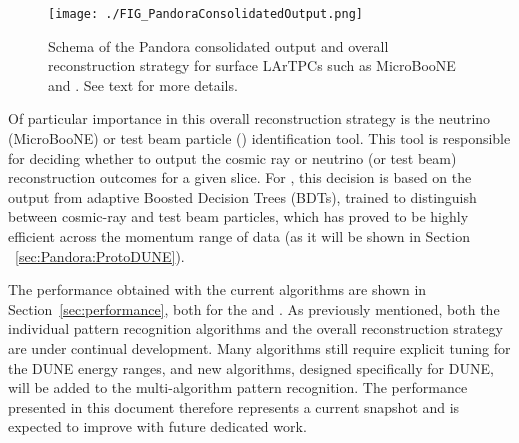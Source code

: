 \begin{figure}[!h!tbp]
\centering
\texttt{[image: ./FIG\_PandoraConsolidatedOutput.png]}
\caption[Schema of the Pandora consolidated output and overall reconstruction strategy for surface LArTPCs]{Schema of the Pandora consolidated output and overall reconstruction strategy for surface LArTPCs such as MicroBooNE and . See text for more details.}
\label{consolidated_reco}
\end{figure}

Of particular importance in this overall reconstruction strategy is the neutrino (MicroBooNE) or test beam particle () identification tool. This tool is responsible for deciding whether to output the cosmic ray or neutrino (or test beam) reconstruction outcomes for a given slice. For , this decision is based on the output from adaptive Boosted Decision Trees (BDTs),  trained to distinguish between cosmic-ray and test beam particles, which has proved to be highly efficient across the momentum range of  data (as it will be shown in Section ~\ref{sec:Pandora:ProtoDUNE}). %


The performance obtained with the current algorithms are shown in Section~\ref{sec:performance}, both for the  and .  As previously mentioned, both the individual pattern recognition algorithms and the overall reconstruction strategy are under continual development. Many algorithms %
still require explicit tuning for the DUNE energy ranges, and new algorithms, designed specifically for DUNE, will be added to the multi-algorithm pattern recognition. The performance presented in this document therefore represents a current snapshot and is expected to improve with future dedicated work. 


